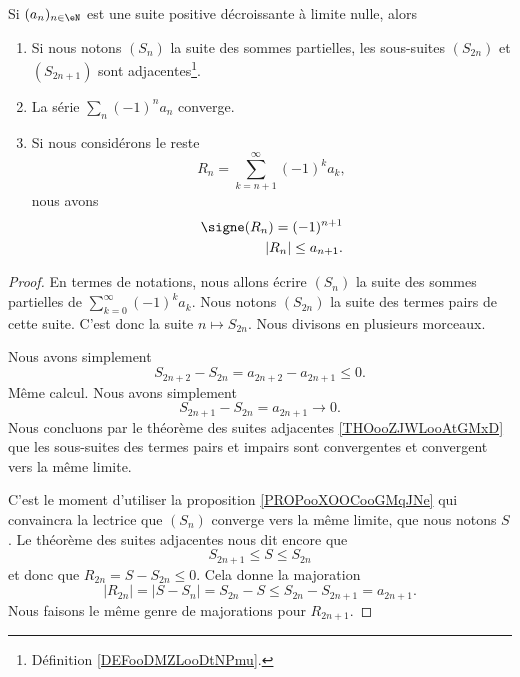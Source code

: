 \begin{theorem}      \label{THOooOHANooHYfkII}
	Si \( (a_n)_{n\in \eN}\) est une suite positive décroissante à limite nulle, alors
	\begin{enumerate}
		\item
		      Si nous notons \( (S_n)\) la suite des sommes partielles, les sous-suites \( (S_{2n})\) et \( (S_{2n+1})\) sont adjacentes\footnote{Définition \ref{DEFooDMZLooDtNPmu}.}.
		\item
		      La série \( \sum_n(-1)^na_n\) converge.
		\item       \label{ITEMooWEPWooXhLMYL}
		      Si nous considérons le reste
		      \begin{equation}
			      R_n=\sum_{k=n+1}^{\infty}(-1)^ka_k,
		      \end{equation}
		      nous avons
		      \begin{subequations}
			      \begin{align}
				      \signe(R_n)=(-1)^{n+1} \\
				      | R_n |\leq a_{n+1}.
			      \end{align}
		      \end{subequations}
	\end{enumerate}
\end{theorem}

\begin{proof}
	En termes de notations, nous allons écrire \( (S_n)\) la suite des sommes partielles de \( \sum_{k=0}^{\infty}(-1)^ka_k\). Nous notons \( (S_{2n})\) la suite des termes pairs de cette suite. C'est donc la suite \( n\mapsto S_{2n}\).
	Nous divisons en plusieurs morceaux.
	\begin{subproof}
		Nous avons simplement
		\begin{equation}
			S_{2n+2}-S_{2n}=a_{2n+2}-a_{2n+1}\leq 0.
		\end{equation}
		Même calcul.
		 Nous avons simplement
		\begin{equation}
			S_{2n+1}-S_{2n}=a_{2n+1}\to 0.
		\end{equation}
		Nous concluons par le théorème des suites adjacentes \ref{THOooZJWLooAtGMxD} que les sous-suites des termes pairs et impairs sont convergentes et convergent vers la même limite.
	\end{subproof}
	C'est le moment d'utiliser la proposition \ref{PROPooXOOCooGMqJNe} qui convaincra la lectrice que \( (S_n)\) converge vers la même limite, que nous notons \( S\). Le théorème des suites adjacentes nous dit encore que
	\begin{equation}
		S_{2n+1}\leq S\leq S_{2n}
	\end{equation}
	et donc que \( R_{2n}=S-S_{2n}\leq 0\). Cela donne la majoration
	\begin{equation}
		| R_{2n} |=| S-S_n |=S_{2n}-S\leq S_{2n}-S_{2n+1}=a_{2n+1}.
	\end{equation}
	Nous faisons le même genre de majorations pour \( R_{2n+1}\).
\end{proof}

